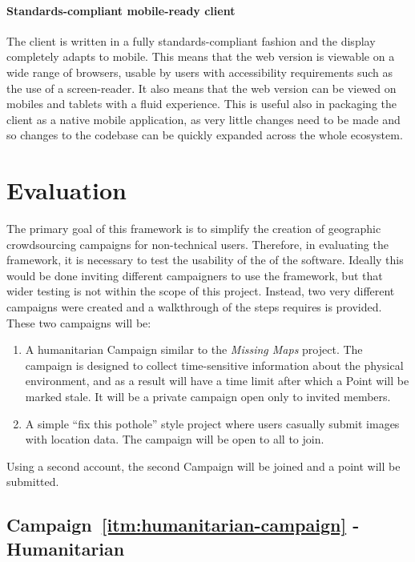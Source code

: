 \documentclass{article}
\newcommand\ssection{\clearpage\section}
\begin{document}
	\paragraph{Standards-compliant mobile-ready client}
	The client is written in a fully standards-compliant fashion and the display completely adapts to mobile. This means that the web version is viewable on a wide range of browsers, usable by users with accessibility requirements such as the use of a screen-reader. It also means that the web version can be viewed on mobiles and tablets with a fluid experience. This is useful also in packaging the client as a native mobile application, as very little changes need to be made and so changes to the codebase can be quickly expanded across the whole ecosystem.

	\ssection{Evaluation}
	\label{sec:evaluation}

		The primary goal of this framework is to simplify the creation of geographic crowdsourcing campaigns for non-technical users. Therefore, in evaluating the framework, it is necessary to test the usability of the of the software. Ideally this would be done inviting different campaigners to use the framework, but that wider testing is not within the scope of this project. Instead, two very different campaigns were created and a walkthrough of the steps requires is provided. These two campaigns will be:

		\begin{enumerate}[label=\Alph*.]
			\item \label{itm:humanitarian-campaign} A humanitarian Campaign similar to the \emph{Missing Maps} project. The campaign is designed to collect time-sensitive information about the physical environment, and as a result will have a time limit after which a Point will be marked stale. It will be a private campaign open only to invited members.
			\item  \label{itm:pothole-campaign} A simple ``fix this pothole'' style project where users casually submit images with location data. The campaign will be open to all to join.
		\end{enumerate}

		Using a second account, the second Campaign will be joined and a point will be submitted.

		\subsection{Campaign~\ref{itm:humanitarian-campaign} - Humanitarian}
		\label{sec:humanitarian-campaign}
\end{document}
